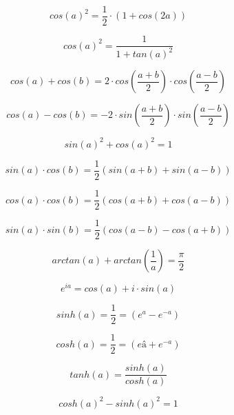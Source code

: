 \documentclass[./\jobname.tex]{subfiles}
\begin{document}
\begin{equation*}
	cos(a)^2 = \frac{1}{2} \cdot (1 + cos(2a))
\end{equation*}

\begin{equation*}
	cos(a)^2 = \frac{1}{1 + tan(a)^2}
\end{equation*}

\begin{equation*}
cos(a) + cos(b) = 2 \cdot cos\left( \frac{a + b}{2} \right) \cdot cos \left( \frac{a - b}{2} \right)
\end{equation*}

\begin{equation*}
cos(a) - cos(b) = -2 \cdot sin \left( \frac{a + b}{2} \right) \cdot sin \left( \frac{a - b}{2} \right)
\end{equation*}

\noindent\makebox[\linewidth]{\rule{\paperwidth}{0.4pt}}

\begin{equation*}
	sin(a)^2 + cos(a)^2 = 1
\end{equation*}

\begin{equation*}
	sin(a) \cdot cos(b) = \frac{1}{2} (sin(a + b) + sin(a-b))
\end{equation*}

\begin{equation*}
	cos(a) \cdot cos(b) = \frac{1}{2} (cos(a + b) + cos(a - b))
\end{equation*}

\begin{equation*}
	sin(a) \cdot sin(b) = \frac{1}{2} (cos(a-b) - cos(a+b))
\end{equation*}

\begin{equation*}
	arctan(a) + arctan\left( \frac{1}{a} \right) = \frac{\pi}{2}
\end{equation*}

\begin{equation*}
	e^{ia} = cos(a) + i \cdot sin(a)
\end{equation*}

\noindent\makebox[\linewidth]{\rule{\paperwidth}{0.4pt}}

\begin{equation*}
	sinh(a) = \frac{1}{2} = \left( e^a - e^{-a} \right)
\end{equation*}

\begin{equation*}
	cosh(a) = \frac{1}{2} = \left( eâ + e^{-a} \right)
\end{equation*}

\begin{equation*}
	tanh(a) = \frac{sinh(a)}{cosh(a)}
\end{equation*}

\begin{equation*}
	cosh(a)^2 - sinh(a)^2 = 1
\end{equation*}
\end{document}

